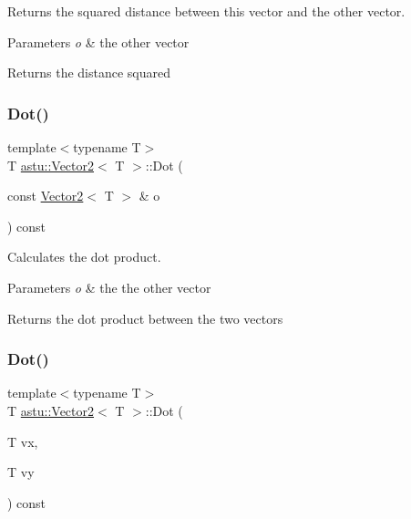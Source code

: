 Returns the squared distance between this vector and the other vector.


\begin{DoxyParams}{Parameters}
{\em o} & the other vector \\
\hline
\end{DoxyParams}
\begin{DoxyReturn}{Returns}
the distance squared 
\end{DoxyReturn}
\mbox{\label{classastu_1_1Vector2_a44f449c9f23b8e5aa2739c3a50b57ceb}} 
\subsubsection{\texorpdfstring{Dot()}{Dot()}\hspace{0.1cm}{\footnotesize\ttfamily [1/2]}}
{\footnotesize\ttfamily template$<$typename T$>$ \\
T \hyperlink{classastu_1_1Vector2}{astu\+::\+Vector2}$<$ T $>$\+::Dot (\begin{DoxyParamCaption}\item[{const \hyperlink{classastu_1_1Vector2}{Vector2}$<$ T $>$ \&}]{o }\end{DoxyParamCaption}) const\hspace{0.3cm}{\ttfamily [inline]}}

Calculates the dot product.


\begin{DoxyParams}{Parameters}
{\em o} & the the other vector \\
\hline
\end{DoxyParams}
\begin{DoxyReturn}{Returns}
the dot product between the two vectors 
\end{DoxyReturn}
\mbox{\label{classastu_1_1Vector2_a0fb863e03982e1583a0945873caf92d7}} 
\subsubsection{\texorpdfstring{Dot()}{Dot()}\hspace{0.1cm}{\footnotesize\ttfamily [2/2]}}
{\footnotesize\ttfamily template$<$typename T$>$ \\
T \hyperlink{classastu_1_1Vector2}{astu\+::\+Vector2}$<$ T $>$\+::Dot (\begin{DoxyParamCaption}\item[{T}]{vx,  }\item[{T}]{vy }\end{DoxyParamCaption}) const\hspace{0.3cm}{\ttfamily [inline]}}

